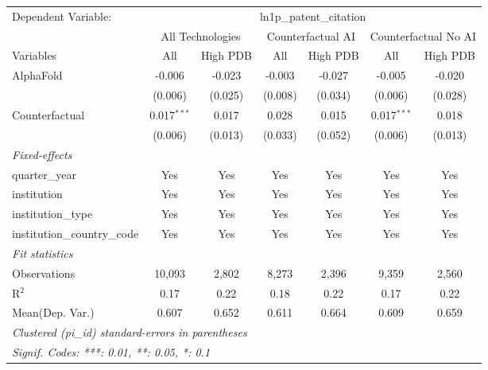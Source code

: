 \begingroup
\centering
\begin{tabular}{lcccccc}
   \tabularnewline \midrule \midrule
   Dependent Variable: & \multicolumn{6}{c}{ln1p\_patent\_citation}\\
 & \multicolumn{2}{c}{All Technologies} & \multicolumn{2}{c}{Counterfactual AI} & \multicolumn{2}{c}{Counterfactual No AI} \\
\cmidrule(lr){1-1}\cmidrule(lr){2-3} \cmidrule(lr){4-5} \cmidrule(lr){6-7}
Variables & \multicolumn{1}{c}{All} & \multicolumn{1}{c}{High PDB} & \multicolumn{1}{c}{All} & \multicolumn{1}{c}{High PDB} & \multicolumn{1}{c}{All} & \multicolumn{1}{c}{High PDB} \\
\cmidrule(lr){1-1}\cmidrule(lr){2-2} \cmidrule(lr){3-3} \cmidrule(lr){4-4} \cmidrule(lr){5-5} \cmidrule(lr){6-6} \cmidrule(lr){7-7}
   AlphaFold                    & -0.006        & -0.023  & -0.003  & -0.027  & -0.005        & -0.020\\   
                                & (0.006)       & (0.025) & (0.008) & (0.034) & (0.006)       & (0.028)\\   
   Counterfactual               & 0.017$^{***}$ & 0.017   & 0.028   & 0.015   & 0.017$^{***}$ & 0.018\\   
                                & (0.006)       & (0.013) & (0.033) & (0.052) & (0.006)       & (0.013)\\   
   \midrule
   \emph{Fixed-effects}\\
   quarter\_year                & Yes           & Yes     & Yes     & Yes     & Yes           & Yes\\  
   institution                  & Yes           & Yes     & Yes     & Yes     & Yes           & Yes\\  
   institution\_type            & Yes           & Yes     & Yes     & Yes     & Yes           & Yes\\  
   institution\_country\_code   & Yes           & Yes     & Yes     & Yes     & Yes           & Yes\\  
   \midrule
   \emph{Fit statistics}\\
   Observations                 & 10,093        & 2,802   & 8,273   & 2,396   & 9,359         & 2,560\\  
   R$^2$                        & 0.17          & 0.22    & 0.18    & 0.22    & 0.17          & 0.22\\  
Mean(Dep. Var.) & 0.607 & 0.652 & 0.611 & 0.664 & 0.609 & 0.659 \\
   \midrule \midrule
   \multicolumn{7}{l}{\emph{Clustered (pi\_id) standard-errors in parentheses}}\\
   \multicolumn{7}{l}{\emph{Signif. Codes: ***: 0.01, **: 0.05, *: 0.1}}\\
\end{tabular}
\par\endgroup
